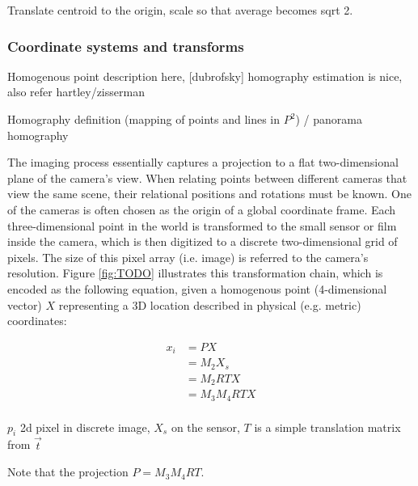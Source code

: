 Translate centroid to the origin, scale so that average becomes sqrt 2.


\subsubsection{Coordinate systems and transforms}

Homogenous point description here, [dubrofsky] homography estimation is nice, also refer hartley/zisserman

Homography definition (mapping of points and lines in $P^2$) / panorama homography

The imaging process essentially captures a projection to a flat two-dimensional plane of the camera's view.
When relating points between different cameras that view the same scene, their relational positions and rotations must be known.
One of the cameras is often chosen as the origin of a global coordinate frame.
Each three-dimensional point in the world is transformed to the small sensor or film inside the camera, which is then digitized to a discrete two-dimensional grid of pixels. The size of this pixel array (i.e. image) is referred to the camera's resolution.
Figure \ref{fig:TODO} illustrates this transformation chain, which is encoded as the following equation, given a homogenous point (4-dimensional vector) $X$ representing a 3D location described in physical (e.g. metric) coordinates:

\begin{align}
	x_i &= P X\\
	  &= M_2 X_s\\ %
	  &= M_2 R T X\\
	  &= M_3 M_4 R T X\\ %
\end{align}

$p_i$ 2d pixel in discrete image, $X_s$ on the sensor, $T$ is a simple translation matrix from $\vec t$

Note that the projection $P = M_3 M_4 R T$.

